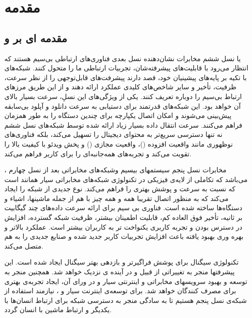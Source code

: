 \chapter{مقدمه}
\section{مقدمه ای بر  و  }
یا 
نسل ششم مخابرات
نشان‌دهنده نسل بعدی فناوری‌های ارتباطی بی‌سیم هستند که انتظار می‌رود با قابلیت‌های پیشرفته‌شان، تجربیات ارتباطی ما را متحول کنند. شبکه‌های
با تکیه بر پایه‌های پیشینیان خود، قصد دارند پیشرفت‌های قابل‌توجهی را از نظر سرعت، ظرفیت، تأخیر و سایر شاخص‌های کلیدی عملکرد ارائه دهند و از این طریق مرزهای ارتباط بی‌سیم را دوباره تعریف کنند. یکی از ویژگی‌های‌ این نسلِ، سرعت بسیار بالای آن خواهد بود. 
این شبکه‌های قدرتمند برای دستیابی به سرعت دانلود و آپلود بی‌سابقه پیش‌بینی می‌شوند و امکان اتصال یکپارچه برای چندین دستگاه را به طور همزمان فراهم می‌کنند. سرعت انتقال داده بسیار زیاد ارائه شده توسط شبکه‌های نسل ششم نه تنها دسترسی سریع‌تر به محتوای دیجیتال را تسهیل می‌کند، بلکه فناوری‌های نوظهوری مانند واقعیت افزوده ()، واقعیت مجازی () و پخش ویدئو با کیفیت بالا را تقویت می‌کند و تجربه‌های همه‌جانبه‌ای را برای کاربر فراهم می‌کند.

،
مخابرات نسل پنجم
سیستمهای بیسیم  وشبکه‌های مخابراتی بعد از نسل چهارم می‌باشد که تکاملی از لایه‌ی فیزیکی در تکنولوژی شبکه‌های مخابراتی سیار همانند  است که نسبت به  سرعت و پوشش بهتری را فراهم می‌کند.
نوع جدیدی از شبکه را ایجاد می‌کند که به منظور اتصال تقریبا همه و همه چیز با هم از جمله ماشینها، اشیاء و دستگاه‌ها ساخته شده است.
 فناوری بی سیم برای ارائه سرعت داده‌های چند گیگابیت بر ثانیه، تأخیر فوق العاده کم، قابلیت اطمینان بیشتر، ظرفیت شبکه گسترده، افزایش در دسترس بودن و تجربه کاربری یکنواخت تر به کاربران بیشتر است. عملکرد بالاتر و بهره وری بهبود یافته باعث افزایش تجربیات کاربر جدید شده و صنایع جدیدی را به هم متصل می‌کند.
 
 
تکنولوژی سیگنال   برای پوشش فراگیرتر و بازدهی بهتر سیگنال ایجاد شده است. این پیشرفتها منجر به تغییراتی از قبیل  و  در آینده ی نزدیک خواهد شد.
همچنین  منجر به توسعه و بهبود سرویسهای مخابراتی و اینترنتی سیار و در ورای آن، ایجاد تجربه‌ی بهتری برای مصرف کنندگان خواهد شد.\newline
برای توسعه‌ی اینترنت سیار و ، نیازمند استفاده از شبکه‌ی نسل پنجم هستیم تا به سادگی منجر به دسترسی شبکه برای ارتباط انسان‌ها با یکدیگر و ارتباط ماشین با انسان گردد.

